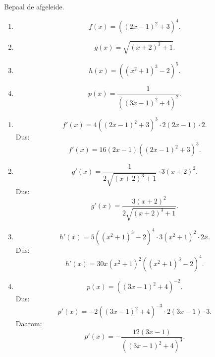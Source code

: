 \documentclass{ximera}
\begin{document}
\begin{oefening}{\oefB\ESS}

Bepaal de afgeleide.

\begin{enumerate}
  \item \[f(x)=\left((2x-1)^2+3\right)^4.\]
  \item \[g(x)=\sqrt{(x+2)^3+1}.\]
  \item \[h(x)=\left((x^2+1)^3-2\right)^5.\]
  \item \[p(x)=\frac{1}{\left((3x-1)^2+4\right)^2}.\]
\end{enumerate}

\begin{oplossing}
\begin{enumerate}
  \item
  \[f'(x)=4\left((2x-1)^2+3\right)^3\cdot2(2x-1)\cdot2.\]
  Dus:
  \[\boxed{f'(x)=16(2x-1)\left((2x-1)^2+3\right)^3.}\]

  \item
  \[g'(x)=\frac{1}{2\sqrt{(x+2)^3+1}}\cdot3(x+2)^2.\]
  Dus:
  \[\boxed{g'(x)=\frac{3(x+2)^2}{2\sqrt{(x+2)^3+1}}.}\]

  \item
  \[h'(x)=5\left((x^2+1)^3-2\right)^4\cdot3(x^2+1)^2\cdot2x.\]
  Dus:
  \[\boxed{h'(x)=30x(x^2+1)^2\left((x^2+1)^3-2\right)^4.}\]

  \item
  \[p(x)=\left((3x-1)^2+4\right)^{-2}.\]
  Dus:
  \[p'(x)=-2\left((3x-1)^2+4\right)^{-3}\cdot2(3x-1)\cdot3.\]
  Daarom:
  \[\boxed{p'(x)=-\frac{12(3x-1)}{\left((3x-1)^2+4\right)^3}.}\]
\end{enumerate}
\end{oplossing}

\end{oefening}
\end{document}
